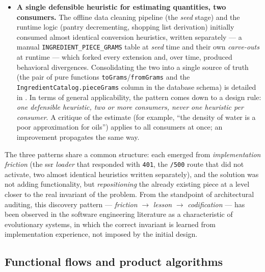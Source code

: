 \begin{itemize}
  \item \textbf{A single defensible heuristic for estimating quantities, two consumers.} The offline data cleaning pipeline (the \textit{seed} stage) and the runtime logic (pantry decrementing, shopping list derivation) initially consumed almost identical conversion heuristics, written separately --- a manual \texttt{INGREDIENT\_PIECE\_GRAMS} table at \textit{seed} time and their own \textit{carve-outs} at runtime --- which forked every extension and, over time, produced behavioral divergences. Consolidating the two into a single source of truth (the pair of pure functions \texttt{toGrams}/\texttt{fromGrams} and the \texttt{IngredientCatalog.pieceGrams} column in the database schema) is detailed in . In terms of general applicability, the pattern comes down to a design rule: \textit{one defensible heuristic, two or more consumers, never one heuristic per consumer}. A critique of the estimate (for example, “the density of water is a poor approximation for oils”) applies to all consumers at once; an improvement propagates the same way.
\end{itemize}

The three patterns share a common structure: each emerged from \textit{implementation friction} (the \acrshort{ssr} \textit{loader} that responded with \texttt{401}, the \texttt{/500} route that did not activate, two almost identical heuristics written separately), and the solution was not adding functionality, but \textit{repositioning} the already existing piece at a level closer to the real invariant of the problem. From the standpoint of architectural auditing, this discovery pattern --- \textit{friction} \(\rightarrow\) \textit{lesson} \(\rightarrow\) \textit{codification} --- has been observed in the software engineering literature as a characteristic of evolutionary systems, in which the correct invariant is learned from implementation experience, not imposed by the initial design.

\subsection{Functional flows and product algorithms}\label{subsec:fluxuri-functionale}

